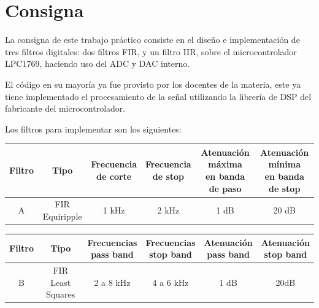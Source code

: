 \documentclass[11pt,a4paper]{report}
\begin{document}
\tableofcontents



\chapter{Consigna}

La consigna de este trabajo práctico consiste en el diseño e implementación de tres filtros digitales: dos filtros FIR, y un filtro IIR, sobre el microcontrolador LPC1769, haciendo uso del ADC y DAC interno.

El código en su mayoría ya fue provisto por los docentes de la materia, este ya tiene implementado el procesamiento de la señal utilizando la librería de DSP del fabricante del microcontrolador.

Los filtros para implementar son los siguientes:

\vspace{0.5cm}

\begin{tabular}{|c|c|c|c|c|c|}
    \hline
    Filtro & Tipo
    & \makecell{Frecuencia \\ de corte}
    & \makecell{Frecuencia \\ de stop}
    & \makecell{Atenuación máxima \\ en banda de paso}
    & \makecell{Atenuación mínima \\ en banda de stop}\\
    \hline
    A & FIR Equiripple & 1 kHz & 2 kHz & 1 dB & 20 dB \\
    \hline
\end{tabular}

\vspace{0.5cm}

\begin{tabular}{|c|c|c|c|c|c|}
    \hline
    Filtro & Tipo
    & \makecell{Frecuencias \\ pass band}
    & \makecell{Frecuencias \\ stop band}
    & \makecell{Atenuación \\ pass band}
    & \makecell{Atenuación \\ stop band} \\
    \hline
    B & \makecell{FIR Least \\ Squares} & 2 a 8 kHz & 4 a 6 kHz & 1 dB & 20dB \\
    \hline
\end{tabular}
\end{document}

